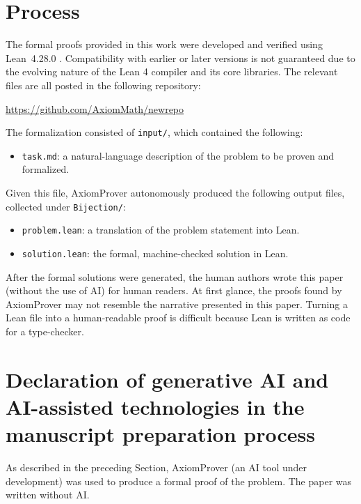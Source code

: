 \documentclass[11pt]{amsart}
\theoremstyle{definition}
\theoremstyle{remark}
\begin{document}
\section*{Process}
The formal proofs provided in this work were developed and verified using Lean~4.28.0 \cite{Lean}.
Compatibility with earlier or later versions is not guaranteed due to the
evolving nature of the Lean 4 compiler and its core libraries.
The relevant files are all posted in the following repository:
\begin{center}
  \url{https://github.com/AxiomMath/newrepo}
\end{center}
The formalization consisted of \texttt{input/}, which contained the following:
\begin{itemize}
\item \texttt{task.md}: a natural-language description of the problem to be proven and formalized.
\end{itemize}
Given this file,
AxiomProver autonomously produced the following output files, collected under \texttt{Bijection/}:
\begin{itemize}
 \item \texttt{problem.lean}: a translation of the problem statement into Lean.
 \item \texttt{solution.lean}: the formal, machine-checked solution in Lean.
\end{itemize}

After the formal solutions were generated, the human authors wrote this paper
(without the use of AI) for human readers.
At first glance, the proofs found by AxiomProver may not resemble the narrative presented in this paper.
Turning a Lean file into a human-readable proof is difficult
because Lean is written as code for a type-checker.

\section*{Declaration of generative AI and AI-assisted technologies in the manuscript preparation process}
As described in the preceding Section,
AxiomProver (an AI tool under development)
was used to produce a formal proof of the problem.
The paper was written without AI.
\end{document}
